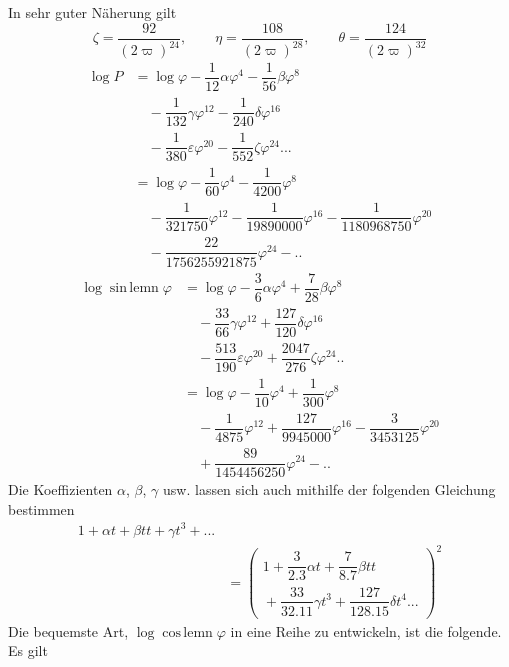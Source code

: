In sehr guter Näherung gilt
\[
\zeta=\dfrac{92}{(2\varpi)^{24}},\qquad
\eta=\dfrac{108}{(2\varpi)^{28}},\qquad
\theta=\dfrac{124}{(2\varpi)^{32}}
\]
\[
\begin{aligned}
\log P&=\log\varphi-\dfrac1{12}\alpha\varphi^4-\dfrac1{56}\beta\varphi^8
\\[6pt]&\quad{}-\dfrac1{132}\gamma\varphi^{12}-\dfrac1{240}\delta\varphi^{16}
\\[6pt]&\quad{}-\dfrac1{380}\varepsilon\varphi^{20}-\dfrac1{552}\zeta\varphi^{24}\mathord{.}\mathord{.}\mathord{.}\\[6pt]
&=\log\varphi-\dfrac1{60}\varphi^4-\dfrac1{4200}\varphi^8
\\[6pt]&\quad{}-\dfrac1{321750}\varphi^{12}-\dfrac1{19890000}\varphi^{16}
-\dfrac1{1180968750}\varphi^{20}\\[6pt]
&\quad-\dfrac{22}{1756255921875}\varphi^{24}-\mathord{.}\mathord{.}
\end{aligned}
\]
\[
\begin{aligned}
\log\operatorname{sin\,lemn}\varphi
&=\log\varphi-\dfrac36\alpha\varphi^4+\dfrac7{28}\beta\varphi^8
\\[6pt]&\quad{}-\dfrac{33}{66}\gamma\varphi^{12}+\dfrac{127}{120}\delta\varphi^{16}
\\[6pt]&\quad{}-\dfrac{513}{190}\varepsilon\varphi^{20}+\dfrac{2047}{276}\zeta\varphi^{24}\mathord{.}\mathord{.}\\[6pt]
&=\log\varphi-\dfrac1{10}\varphi^4+\dfrac1{300}\varphi^8
\\[6pt]&\quad{}-\dfrac1{4875}\varphi^{12}+\dfrac{127}{9945000}\varphi^{16}
-\dfrac3{3453125}\varphi^{20}\\[6pt]
&\quad+\dfrac{89}{1454456250}\varphi^{24}-\mathord{.}\mathord{.}
\end{aligned}
\]
Die Koeffizienten $\alpha$, $\beta$, $\gamma$ usw. lassen sich auch mithilfe der folgenden Gleichung bestimmen
\[
\begin{aligned}1+\alpha t+\beta tt+\gamma t^3+\mathord{.}\mathord{.}\mathord{.}
\\[6pt]&=\left(\begin{gathered}1+\dfrac3{2.3}\alpha t+\dfrac7{8.7}\beta tt
\\[4pt]{}+\dfrac{33}{32.11}\gamma t^3+\dfrac{127}{128.15}\delta t^4\mathord{.}\mathord{.}\mathord{.}\end{gathered}\right)^2\end{aligned}
\]
Die bequemste Art, $\log\operatorname{cos\,lemn}\varphi$ in eine Reihe zu entwickeln, ist die folgende. Es gilt
